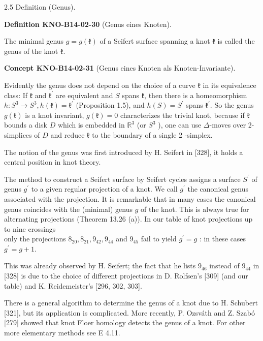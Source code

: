 \documentclass[10pt, letterpaper]{article}
\newcommand{\CustomHeading}[3]{%
  \par\medskip\noindent%
  \textbf{#1 #2} \textnormal{(#3)}.\enskip%
}
\newenvironment{DEF}[2]{\begin{unitbox}\CustomHeading{Definition}{#1}{#2}}{\end{unitbox}}
\newenvironment{CONC}[2]{\begin{unitbox}\CustomHeading{Concept}{#1}{#2}}{\end{unitbox}}
\begin{document}
2.5 Definition (Genus). 

\begin{DEF}{KNO-B14-02-30}{Genus eines Knoten}
The minimal genus $g=g(\mathfrak{k})$ of a Seifert surface spanning a knot $\mathfrak{k}$ is called the genus of the knot $\mathfrak{k}$.
\end{DEF}


\begin{CONC}{KNO-B14-02-31}{Genus eines Knoten als Knoten-Invariante}
Evidently the genus does not depend on the choice of a curve $\mathfrak{k}$ in its equivalence class: If $\mathfrak{k}$ and $\mathfrak{k}^{\prime}$ are equivalent and $S$ spans $\mathfrak{k}$, then there is a homeomorphism $h: S^{3} \rightarrow S^{3}, h(\mathfrak{k})=\mathfrak{k}^{\prime}$ (Proposition 1.5), and $h(S)=S^{\prime}$ spans $\mathfrak{k}^{\prime}$. So the genus $g(\mathfrak{k})$ is a knot invariant, $g(\mathfrak{k})=0$ characterizes the trivial knot, because if $\mathfrak{k}$ bounds a disk $D$ which is embedded in $\mathbb{R}^{3}$ (or $S^{3}$ ), one can use $\Delta$-moves over 2-simplices of $D$ and reduce $\mathfrak{k}$ to the boundary of a single 2 -simplex.
\end{CONC}

The notion of the genus was first introduced by H. Seifert in [328], it holds a central position in knot theory.


The method to construct a Seifert surface by Seifert cycles assigns a surface $S^{\prime}$ of genus $g^{\prime}$ to a given regular projection of a knot. We call $g^{\prime}$ the canonical genus associated with the projection. It is remarkable that in many cases the canonical genus coincides with the (minimal) genus $g$ of the knot. This is always true for alternating projections (Theorem 13.26 (a)). In our table of knot projections up to nine crossings\\
only the projections $8_{20}, 8_{21}, 9_{42}, 9_{44}$ and $9_{45}$ fail to yield $g^{\prime}=g$ : in these cases $g^{\prime}=g+1$.

This was already observed by H. Seifert; the fact that he lists $9_{46}$ instead of $9_{44}$ in [328] is due to the choice of different projections in D. Rolfsen's [309] (and our table) and K. Reidemeister's [296, 302, 303].

There is a general algorithm to determine the genus of a knot due to H. Schubert [321], but its application is complicated. More recently, P. Ozsváth and Z. Szabó [279] showed that knot Floer homology detects the genus of a knot. For other more elementary methods see E 4.11.\\
\end{document}
